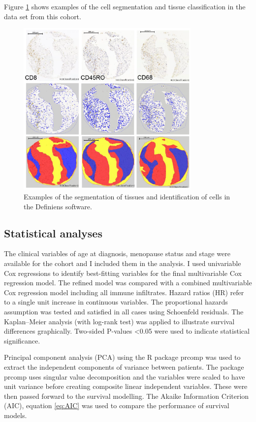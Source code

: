 Figure \ref{fig:segmentation} shows examples of the cell segmentation and tissue classification in the data set from this cohort.

\begin{figure}[htbp!] 
\centering    
\includegraphics[width=0.8\textwidth]{Chapter2/Figs/Raster/Segmentation.png}
\caption[Segmentation in Definiens]{Examples of the segmentation of tissues and identification of cells in the Definiens software.}
\label{fig:segmentation}
\end{figure}

\subsection{Statistical analyses}
 The clinical variables of age at diagnosis, menopause status and stage were available for the cohort and I included them in the analysis. I used univariable Cox regressions to identify best-fitting variables for the final multivariable Cox regression model. The refined model was compared with a combined multivariable Cox regression model including all immune infiltrates. Hazard ratios (HR) refer to a single unit increase in continuous variables. The proportional hazards assumption was tested and satisfied in all cases using Schoenfeld residuals. The Kaplan–Meier analysis (with log-rank test) was applied to illustrate survival differences graphically. Two-sided P-values <0.05 were used to indicate statistical significance. 

Principal component analysis (PCA) using the R package prcomp was used to extract the independent components of variance between patients. The package prcomp uses singular value decomposition and the variables were scaled to have unit variance before creating composite linear independent variables. These were then passed forward to the survival modelling. The Akaike Information Criterion (AIC), equation \ref{eq:AIC} was used to compare the performance of survival models.

